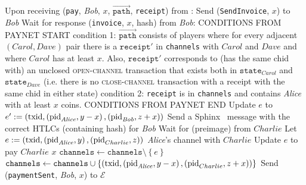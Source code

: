 \begin{algorithmic}[1]
    \State Upon receiving (\texttt{pay}, \textit{Bob}, $x$,
    $\overrightarrow{\mathtt{path}}$, \texttt{receipt}) from \environment:
      \State Send (\texttt{SendInvoice}, $x$) to \textit{Bob}
      \State Wait for response (\texttt{invoice}, $x$, hash) from \textit{Bob}:
      \Indent
        \State CONDITIONS FROM PAYNET START
        \State condition 1: $\overrightarrow{\mathtt{path}}$ consists of players
        where for every adjacent $\left(Carol, Dave\right)$ pair there is a
        $\mathtt{receipt}'$ in \texttt{channels} with $Carol$ and $Dave$ and
        where $Carol$ has at least $x$. Also, $\mathtt{receipt}'$ corresponds to
        (has the same chid with) an unclosed \textsc{open-channel} transaction
        that exists both in $\mathtt{state}_{Carol}$ and $\mathtt{state}_{Dave}$
        (i.e. there is no \textsc{close-channel} transaction with a receipt with
        the same chid in either state)
        \State condition 2: \texttt{receipt} is in \texttt{channels} and
        contains \textit{Alice} with at least $x$ coins.
        \State CONDITIONS FROM PAYNET END
      \EndIndent
        \State Update $e$ to $e' := \left(\mathrm{txid},
        \left(\mathrm{pid}_{\mathit{Alice}}, y - x\right),
        \left(\mathrm{pid}_{\mathit{Bob}}, z + x\right)\right)$ 
        \State Send a Sphinx~\cite{sphinx} message with the correct HTLCs
        (containing hash) for \textit{Bob}
        \State {}
        \State Wait for (preimage) from $Charlie$
          \State Let $e := \left(\mathrm{txid}, \left(\mathrm{pid}_{\mathit{Alice}},
          y\right), \left(\mathrm{pid}_{Charlie}, z\right)\right)$ \textit{Alice}'s
          channel with $Charlie$
          \State Update $e$ to pay $Charlie$ $x$ 
          \State $\mathtt{channels} \gets \mathtt{channels} \setminus
          \left\{e\right\}$
          \State $\mathtt{channels} \gets \mathtt{channels} \cup
          \left\{\left(\mathrm{txid},
          \left(\mathrm{pid}_{\mathit{Alice}}, y - x\right),
          \left(\mathrm{pid}_{Charlie}, z + x\right)\right)\right\}$
          \State Send (\texttt{paymentSent}, \textit{Bob}, $x$) to $\mathcal{E}$

\end{algorithmic}
